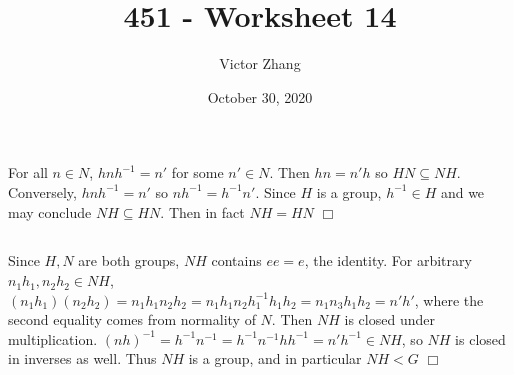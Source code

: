 \documentclass{article}
\title{451 - Worksheet 14}
\author{Victor Zhang}
\date{October 30, 2020}
\begin{document}
\maketitle

\section{}
\subsection{}
For all $n \in N$, $hnh^{-1} = n'$ for some $n' \in N$. Then $hn = n'h$ so $HN \subseteq NH$. Conversely, $hnh^{-1} = n'$ so $nh^{-1} = h^{-1}n'$. Since $H$ is a group, $h^{-1} \in H$ and we may conclude $NH \subseteq HN$. Then in fact $NH = HN$ $\Box$
\subsection{}
Since $H,N$ are both groups, $NH$ contains $ee = e$, the identity. For arbitrary $n_1h_1, n_2h_2 \in NH$, $(n_1h_1)(n_2h_2) = n_1h_1n_2h_2 = n_1h_1n_2h_1^{-1}h_1h_2 = n_1n_3h_1h_2 = n'h'$, where the second equality comes from normality of $N$. Then $NH$ is closed under multiplication. $(nh)^{-1} = h^{-1}n^{-1} = h^{-1}n^{-1}hh^{-1} = n'h^{-1} \in NH$, so $NH$ is closed in inverses as well. Thus $NH$ is a group, and in particular $NH < G$ $\Box$
\end{document}
